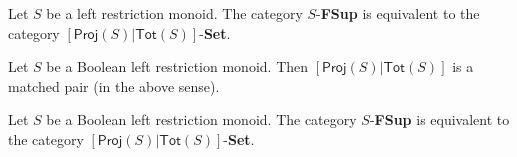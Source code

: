 \documentclass[10pt,a4paper]{amsart}
\begin{document}
\begin{theorem}\label{them:mary} Let $S$ be a left restriction monoid.  
The category $S$-{\bf FSup} is equivalent to the category $[\mathsf{Proj}(S)|\mathsf{Tot}(S)]$-{\bf Set}.
\end{theorem}

\begin{lemma}\label{lem:anne} Let $S$ be a Boolean left restriction monoid.
Then $[\mathsf{Proj}(S)|\mathsf{Tot}(S)]$ is a matched pair (in the above sense).
\end{lemma}

\begin{theorem}\label{them:marytwo} Let $S$ be a Boolean left restriction monoid.  
The category $S$-{\bf FSup} is equivalent to the category $[\mathsf{Proj}(S)|\mathsf{Tot}(S)]$-{\bf Set}.
\end{theorem}
\end{document}

